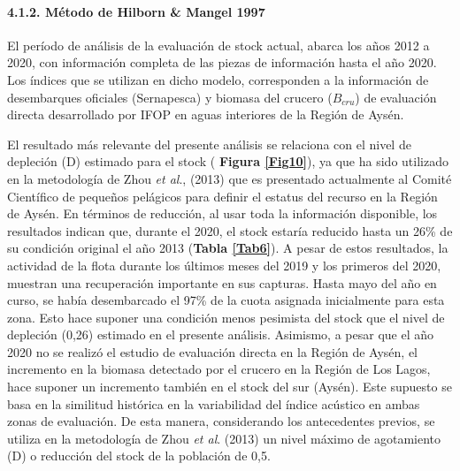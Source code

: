 \documentclass[
  spanish,
]{article}
\begin{document}
\hypertarget{muxe9todo-de-hilborn-mangel-1997-1}{%
\paragraph{4.1.2. Método de Hilborn \& Mangel
1997}\label{muxe9todo-de-hilborn-mangel-1997-1}}

\quad

El período de análisis de la evaluación de stock actual, abarca los años
2012 a 2020, con información completa de las piezas de información hasta
el año 2020. Los índices que se utilizan en dicho modelo, corresponden a
la información de desembarques oficiales (Sernapesca) y biomasa del
crucero (\(B_{cru}\)) de evaluación directa desarrollado por IFOP en
aguas interiores de la Región de Aysén.

El resultado más relevante del presente análisis se relaciona con el
nivel de depleción (D) estimado para el stock (
\textbf{Figura \ref{Fig10}}), ya que ha sido utilizado en la metodología
de Zhou \emph{et al}., (2013) que es presentado actualmente al Comité
Científico de pequeños pelágicos para definir el estatus del recurso en
la Región de Aysén. En términos de reducción, al usar toda la
información disponible, los resultados indican que, durante el 2020, el
stock estaría reducido hasta un 26\% de su condición original el año
2013 (\textbf{Tabla \ref{Tab6}}). A pesar de estos resultados, la
actividad de la flota durante los últimos meses del 2019 y los primeros
del 2020, muestran una recuperación importante en sus capturas. Hasta
mayo del año en curso, se había desembarcado el 97\% de la cuota
asignada inicialmente para esta zona. Esto hace suponer una condición
menos pesimista del stock que el nivel de depleción (0,26) estimado en
el presente análisis. Asimismo, a pesar que el año 2020 no se realizó el
estudio de evaluación directa en la Región de Aysén, el incremento en la
biomasa detectado por el crucero en la Región de Los Lagos, hace suponer
un incremento también en el stock del sur (Aysén). Este supuesto se basa
en la similitud histórica en la variabilidad del índice acústico en
ambas zonas de evaluación. De esta manera, considerando los antecedentes
previos, se utiliza en la metodología de Zhou \emph{et al}. (2013) un
nivel máximo de agotamiento (D) o reducción del stock de la población de
0,5.

\vspace{0.5cm}
\end{document}
